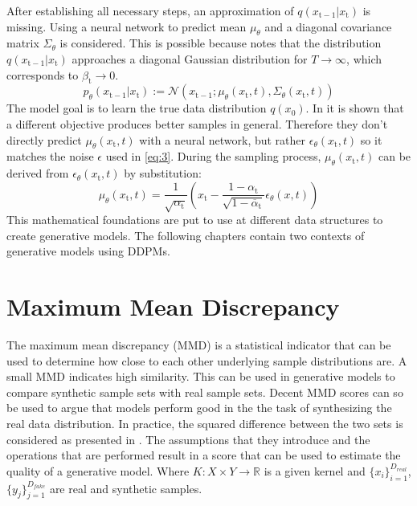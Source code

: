 After establishing all necessary steps, an approximation of $q(x_\mathrm{t-1}|x_\mathrm{t})$ is missing. Using a neural network to predict mean $\mu_\theta$ and a diagonal covariance matrix $\Sigma_\theta$ is considered. This is possible because \cite{sohl-dickstein_deep_2015} notes that the distribution $q(x_\mathrm{t-1}|x_\mathrm{t})$ approaches a diagonal Gaussian distribution for $T \rightarrow \infty$, which corresponds to $\beta_\mathrm{t} \rightarrow 0$.
\begin{equation}
\label{eq:7}
    p_\theta(x_\mathrm{t-1}|x_\mathrm{t}) := \mathcal{N}(x_\mathrm{t-1};\mu_\theta(x_\mathrm{t},t),\Sigma_\theta(x_\mathrm{t},t))
\end{equation}
The model goal is to learn the true data distribution $q(x_0)$. In \cite{ho_denoising_2020} it is shown that a different objective produces better samples in general. Therefore they don't directly predict $\mu_\theta(x_\mathrm{t},t)$ with a neural network, but rather $\epsilon_{\theta}(x_\mathrm{t}, t)$ so it matches the noise $\epsilon$  used in \ref{eq:3}. During the sampling process, $\mu_\theta(x_\mathrm{t},t)$ can be derived from $\epsilon_{\theta}(x_\mathrm{t}, t)$ by substitution:
\begin{equation}
\label{eq:8}
    \mu_\theta(x_\mathrm{t},t) = \frac{1}{\sqrt{\alpha_\mathrm{t}}}\left(x_\mathrm{t} - \frac{1-\alpha_\mathrm{t}}{\sqrt{1-\overline{\alpha}_\mathrm{t}}}\epsilon_{\theta}(x,t)\right)
\end{equation}
This mathematical foundations are put to use at different data structures to create generative models. The following chapters contain two contexts of generative models using DDPMs.
\newpage
\section{Maximum Mean Discrepancy}
\label{sec:mmd}
The maximum mean discrepancy (MMD) \cite{gretton2008kernel} is a statistical indicator that can be used to determine how close to each other underlying sample distributions are.
A small MMD indicates high similarity. This can be used in generative models to compare synthetic sample sets with real sample sets.
Decent MMD scores can so be used to argue that models perform good in the the task of synthesizing the real data distribution.\newline
In practice, the squared difference between the two sets is considered as presented in \cite{esteban2017realvalued}.
The assumptions that they introduce and the operations that are performed result in a score that can be used to estimate the quality of 
a generative model.\newline \newline
{} \newline\newline
Where $K:X \times Y \rightarrow \mathbb{R} $ is a given kernel and $\{x_{i}\}^{D_{real}}_{i=1}$,
$\{y_{j}\}^{D_{fake}}_{j=1}$ are real and synthetic samples.
